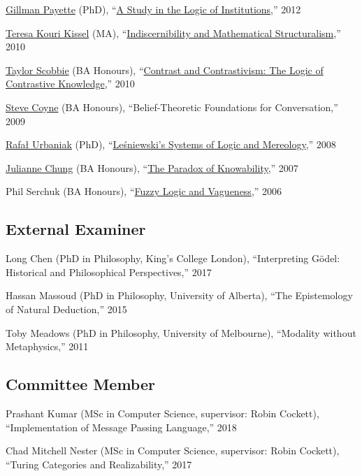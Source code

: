 \documentclass[11pt]{article}
\begin{document}
\ind \href{https://uleth.academia.edu/GillmanPayette}{Gillman Payette} (PhD), ``\href{http://hdl.handle.net/11023/115}{A Study in the Logic of Institutions},'' 2012

\ind \href{https://sites.google.com/site/teresakouri/}{Teresa Kouri Kissel} (MA), ``\href{http://dspace.ucalgary.ca/handle/1880/47829}{Indiscernibility and Mathematical Structuralism},'' 2010

\ind \href{https://www.linkedin.com/in/taylor-scobbie-42aa70bb}{Taylor Scobbie} (BA Honours), ``\href{http://dspace.ucalgary.ca/handle/1880/51000}{Contrast and Contrastivism: The Logic of Contrastive Knowledge},'' 2010

\ind \href{http://www.stevecoyne.ca/}{Steve Coyne} (BA Honours), ``Belief-Theoretic Foundations for Conversation,'' 2009

\ind \href{https://ugent.academia.edu/RafalUrbaniak}{Rafał Urbaniak} (PhD), ``\href{http://dspace.ucalgary.ca/handle/1880/46697}{Leśniewski's Systems of Logic and Mereology},'' 2008

\ind \href{https://louisville.edu/philosophy/People/faculty-profile-pages/julianne-chung}{Julianne Chung} (BA Honours), ``\href{http://dspace.ucalgary.ca/handle/1880/46819}{The Paradox of Knowability},'' 2007

\ind Phil Serchuk (BA Honours), ``\href{http://dspace.ucalgary.ca/handle/1880/46689}{Fuzzy Logic and Vagueness},'' 2006

\subsection{External Examiner}
\ind Long Chen (PhD in Philosophy, King's College London), ``Interpreting Gödel: Historical and Philosophical Perspectives,'' 2017

\ind Hassan Massoud (PhD in Philosophy, University of Alberta), ``The Epistemology of Natural Deduction,'' 2015

\ind Toby Meadows (PhD in Philosophy, University of Melbourne), ``Modality without Metaphysics,'' 2011

\subsection{Committee Member}
\ind Prashant Kumar (MSc in Computer Science, supervisor: Robin Cockett), ``Implementation of Message Passing Language,'' 2018

\ind Chad Mitchell Nester (MSc in Computer Science, supervisor: Robin Cockett), ``Turing Categories and Realizability,'' 2017
\end{document}
